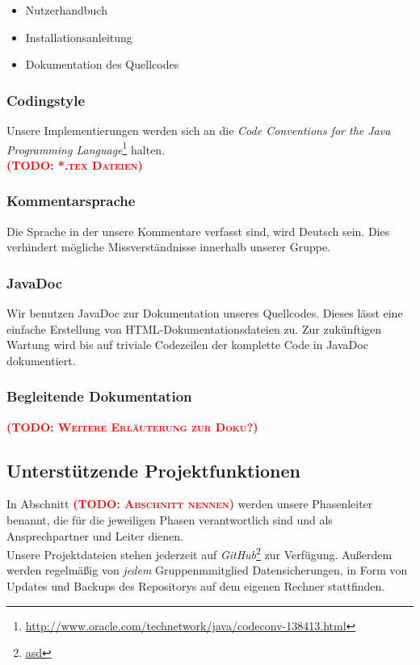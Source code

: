 \documentclass[fontsize=12pt,paper=a4,twoside]{scrartcl}
\newcommand{\todo}[1]{\textbf{\textsc{\textcolor{red}{(TODO: #1)}}}}
\begin{document}
\begin{itemize}
\item{Nutzerhandbuch}
\item{Installationsanleitung}
\item{Dokumentation des Quellcodes}
\end{itemize}

\subsubsection{Codingstyle}
Unsere Implementierungen werden sich an die \emph{Code Conventions for the Java Programming Language}\footnote{\url{http://www.oracle.com/technetwork/java/codeconv-138413.html}} halten.\\
\todo{*.tex Dateien}

\subsubsection{Kommentarsprache}
Die Sprache in der unsere Kommentare verfasst sind, wird Deutsch sein. Dies verhindert mögliche Missverständnisse innerhalb unserer Gruppe.

\subsubsection{JavaDoc}
Wir benutzen JavaDoc zur Dokumentation unseres Quellcodes. Dieses lässt eine einfache Erstellung von HTML-Dokumentationsdateien zu.
Zur zukünftigen Wartung wird bis auf triviale Codezeilen der komplette Code in JavaDoc dokumentiert.
\subsubsection{Begleitende Dokumentation}
\todo{Weitere Erläuterung zur Doku?}
\subsection{Unterstützende Projektfunktionen}
In Abschnitt \todo{Abschnitt nennen} werden unsere Phasenleiter benannt, die für die jeweiligen Phasen verantwortlich sind und als Ansprechpartner und Leiter dienen.\\
Unsere Projektdateien stehen jederzeit auf \emph{GitHub}\footnote{\url{asd}} zur Verfügung. Außerdem werden regelmäßig von \emph{jedem} Gruppenmmitglied Datensicherungen, in Form von Updates und Backups des Repositorys auf dem eigenen Rechner stattfinden.\\
\end{document}
